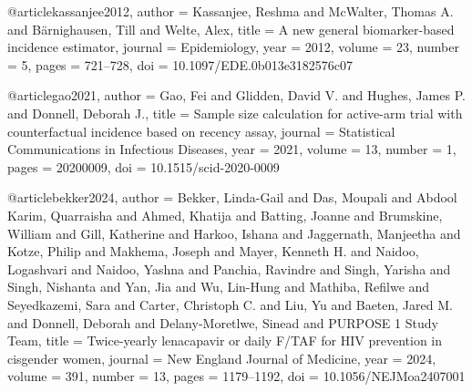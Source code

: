 %

@article{kassanjee2012,
  author  = {Kassanjee, Reshma and McWalter, Thomas A. and B{\"a}rnighausen, Till and Welte, Alex},
  title   = {A new general biomarker-based incidence estimator},
  journal = {Epidemiology},
  year    = {2012},
  volume  = {23},
  number  = {5},
  pages   = {721--728},
  doi     = {10.1097/EDE.0b013e3182576c07}
}

@article{gao2021,
  author  = {Gao, Fei and Glidden, David V. and Hughes, James P. and Donnell, Deborah J.},
  title   = {Sample size calculation for active-arm trial with counterfactual incidence based on recency assay},
  journal = {Statistical Communications in Infectious Diseases},
  year    = {2021},
  volume  = {13},
  number  = {1},
  pages   = {20200009},
  doi     = {10.1515/scid-2020-0009}
}

@article{bekker2024,
  author  = {Bekker, Linda-Gail and Das, Moupali and Abdool Karim, Quarraisha and Ahmed, Khatija and Batting, Joanne and Brumskine, William and Gill, Katherine and Harkoo, Ishana and Jaggernath, Manjeetha and Kotze, Philip and Makhema, Joseph and Mayer, Kenneth H. and Naidoo, Logashvari and Naidoo, Yashna and Panchia, Ravindre and Singh, Yarisha and Singh, Nishanta and Yan, Jia and Wu, Lin-Hung and Mathiba, Refilwe and Seyedkazemi, Sara and Carter, Christoph C. and Liu, Yu and Baeten, Jared M. and Donnell, Deborah and Delany-Moretlwe, Sinead and {PURPOSE 1 Study Team}},
  title   = {Twice-yearly lenacapavir or daily {F/TAF} for {HIV} prevention in cisgender women},
  journal = {New England Journal of Medicine},
  year    = {2024},
  volume  = {391},
  number  = {13},
  pages   = {1179--1192},
  doi     = {10.1056/NEJMoa2407001}
}


